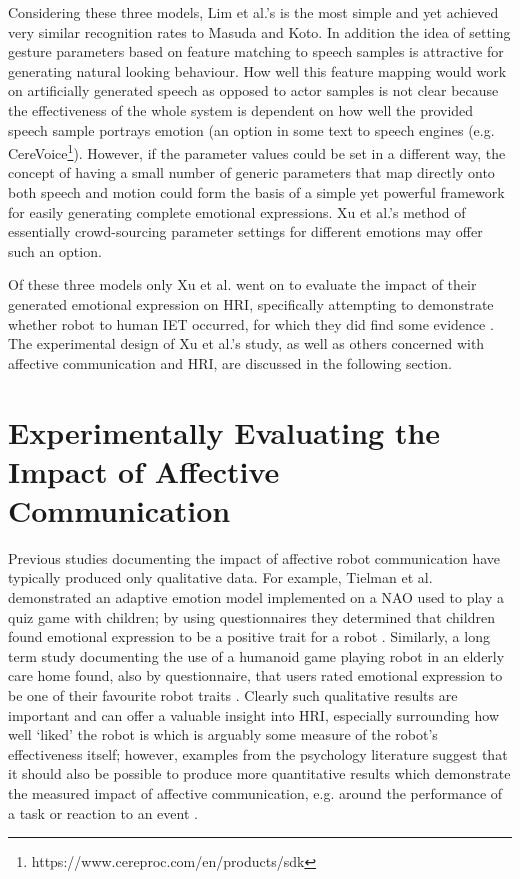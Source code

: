 \documentclass[11pt,a4paper]{report}
\begin{document}
Considering these three models, Lim et al.'s is the most simple and yet achieved very similar recognition rates to Masuda and Koto. In addition the idea of setting gesture parameters based on feature matching to speech samples is attractive for generating natural looking behaviour. How well this feature mapping would work on artificially generated speech as opposed to actor samples is not clear because the effectiveness of the whole system is dependent on how well the provided speech sample portrays emotion (an option in some text to speech engines (e.g. CereVoice\footnote{https://www.cereproc.com/en/products/sdk}). However, if the parameter values could be set in a different way, the concept of having a small number of generic parameters that map directly onto both speech and motion could form the basis of a simple yet powerful framework for easily generating complete emotional expressions. Xu et al.'s method of essentially crowd-sourcing parameter settings for different emotions may offer such an option. 

Of these three models only Xu et al. went on to evaluate the impact of their generated emotional expression on HRI, specifically attempting to demonstrate whether robot to human IET occurred, for which they did find some evidence \cite{xu2014robot}. The experimental design of Xu et al.'s study, as well as others concerned with affective communication and HRI, are discussed in the following section.

\section{Experimentally Evaluating the Impact of Affective Communication}

Previous studies documenting the impact of affective robot communication have typically produced only qualitative data. For example, Tielman et al. demonstrated an adaptive emotion model implemented on a NAO used to play a quiz game with children; by using questionnaires they determined that children found emotional expression to be a positive trait for a robot \cite{tielman2014adaptive}. Similarly, a long term study documenting the use of a humanoid game playing robot in an elderly care home found, also by questionnaire, that users rated emotional expression to be one of their favourite robot traits \cite{louie2012playing}. Clearly such qualitative results are important and can offer a valuable insight into HRI, especially surrounding how well `liked' the robot is which is arguably some measure of the robot's effectiveness itself; however, examples from the psychology literature suggest that it should also be possible to produce more quantitative results which demonstrate the measured impact of affective communication, e.g. around the performance of a task \cite{barsade2002ripple} or reaction to an event \cite{latane1968group}.
\end{document}

